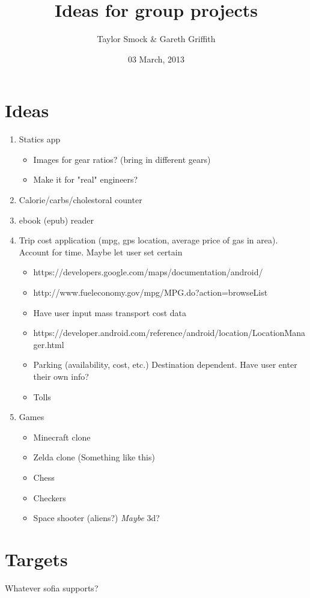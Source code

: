 \documentclass{article}
\author{Taylor Smock &  Gareth Griffith}
\title{Ideas for group projects}
\date{03 March, 2013}
\begin{document}
\section{Ideas}
	\begin{enumerate}
		\item Statics app
			\begin{itemize}
				\item Images for gear ratios? (bring in different gears)
				\item Make it for "real" engineers?
			\end{itemize}
		\item Calorie/carbs/cholestoral counter
		\item ebook (epub) reader
		\item Trip cost application (mpg, gps location, average price of gas in area). Account for time. Maybe let user set certain
			\begin{itemize}
				\item https://developers.google.com/maps/documentation/android/
				\item http://www.fueleconomy.gov/mpg/MPG.do?action=browseList
				\item Have user input mass transport cost data
				\item https://developer.android.com/reference/android/location/LocationManager.html
				\item Parking (availability, cost, etc.) Destination dependent. Have user enter their own info?
				\item Tolls
			\end{itemize}
		\item Games
		\begin{itemize}
			\item Minecraft clone
			\item Zelda clone (Something like this)
			\item Chess
			\item Checkers
			\item Space shooter (aliens?) \textit{Maybe} 3d?
		\end{itemize}
	\end{enumerate}
\section{Targets}
	Whatever sofia supports?
\end{document}
